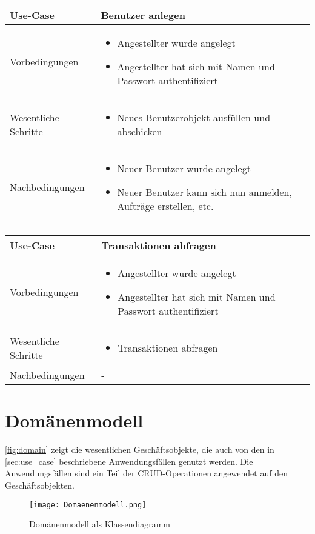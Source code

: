 \documentclass[12pt, a4paper, titlepage]{article}
\begin{document}
\begin{tabular}{|p{}|p{}|}
	\hline
	Use-Case & Benutzer anlegen \\
	\hline
	Vorbedingungen & 
		\begin{itemize}
			\item Angestellter wurde angelegt
			\item Angestellter hat sich mit Namen und Passwort authentifiziert
		\end{itemize} \\
	\hline
	Wesentliche Schritte &
		\begin{itemize}
			\item Neues Benutzerobjekt ausfüllen und abschicken
		\end{itemize} \\
	\hline
	Nachbedingungen &
		\begin{itemize}
			\item Neuer Benutzer wurde angelegt
			\item Neuer Benutzer kann sich nun anmelden, Aufträge erstellen, etc.
		\end{itemize} \\
	\hline
\end{tabular}

\begin{tabular}{|p{}|p{}|}
	\hline
	Use-Case & Transaktionen abfragen \\
	\hline
	Vorbedingungen & 
		\begin{itemize}
			\item Angestellter wurde angelegt
			\item Angestellter hat sich mit Namen und Passwort authentifiziert
		\end{itemize} \\
	\hline
	Wesentliche Schritte &
		\begin{itemize}
			\item Transaktionen abfragen
		\end{itemize} \\
	\hline
	Nachbedingungen & - \\
	\hline
\end{tabular}

\section{Domänenmodell}
\autoref{fig:domain} zeigt die wesentlichen Geschäftsobjekte, die auch von den
in \autoref{sec:use_case} beschriebene Anwendungsfällen genutzt werden.
Die Anwendungsfällen sind ein Teil der CRUD-Operationen angewendet auf den
Geschäftsobjekten.
\begin{figure}[H]
	\centering
    \texttt{[image: Domaenenmodell.png]}
	\caption{Domänenmodell als Klassendiagramm}
	\label{fig:domain}
\end{figure}
\end{document}
